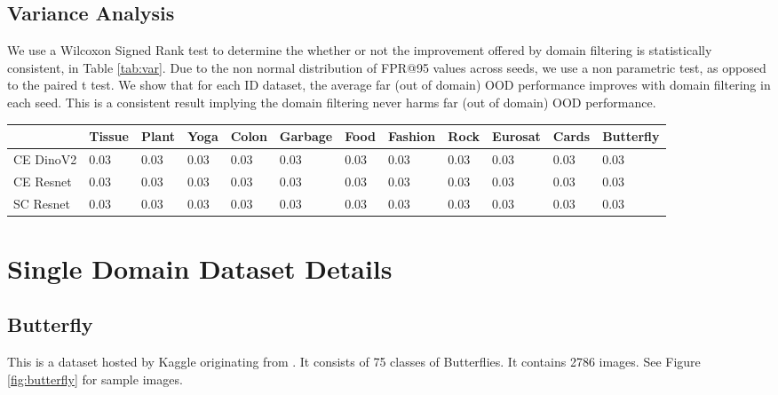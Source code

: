 \documentclass[letterpaper]{article} %
\theoremstyle{plain}
\theoremstyle{definition}
\theoremstyle{remark}
\begin{document}
\subsection{Variance Analysis}

\label{variance}

We use a Wilcoxon Signed Rank test to determine the whether or not the improvement offered by domain filtering is statistically consistent, in Table \ref{tab:var}. Due to the non normal distribution of FPR@95 values across seeds, we use a non parametric test, as opposed to the paired t test. We show that for each ID dataset, the average far (out of domain) OOD performance improves with domain filtering in each seed. This is a consistent result implying the domain filtering never harms far (out of domain) OOD performance.


\begin{sidewaystable}
    

\caption{Wilcoxon signed-rank test p-values comparing FPR@95 in Far (Out of Domain) OOD detection using regular KNN and domain filtered KNN across models and ID datasets. Low p-values indicate statistically significant improvements from filtering. Note that the p value of 0.03125 indicates that in all 5 seeds, the domain filtered KNN method achieved lower FPR@95 than the regular KNN method. This is also the lowest possible p value with a paired sample size of 5.}
\label{tab:var}
\begin{tabular}{llllllllllll}
\toprule
 & Tissue & Plant & Yoga & Colon & Garbage & Food & Fashion & Rock & Eurosat & Cards & Butterfly \\
\midrule
CE DinoV2 & 0.03 & 0.03 & 0.03 & 0.03 & 0.03 & 0.03 & 0.03 & 0.03 & 0.03 & 0.03 & 0.03 \\
CE Resnet & 0.03 & 0.03 & 0.03 & 0.03 & 0.03 & 0.03 & 0.03 & 0.03 & 0.03 & 0.03 & 0.03 \\
SC Resnet & 0.03 & 0.03 & 0.03 & 0.03 & 0.03 & 0.03 & 0.03 & 0.03 & 0.03 & 0.03 & 0.03 \\
\bottomrule
\end{tabular}
\end{sidewaystable}

\section{Single Domain Dataset Details}

\label{dataset}


\subsection{Butterfly}  This is a dataset hosted by Kaggle originating from \citep{AIPlanet_DataSprint107_2024}. It consists of 75 classes of Butterflies. It contains 2786 images. See Figure \ref{fig:butterfly} for sample images. 
\end{document}
